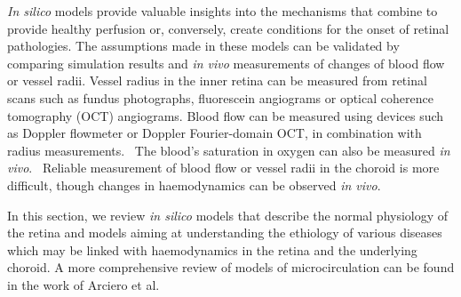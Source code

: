 \documentclass[12pt,a4paper]{journal}
\begin{document}
\textit{In silico} models provide valuable insights into the mechanisms that combine to provide healthy perfusion or, conversely, create conditions for the onset of retinal pathologies.
The assumptions made in these models can be validated by comparing simulation results and \textit{in vivo} measurements of changes of blood flow or vessel radii.
Vessel radius in the inner retina can be measured from retinal scans such as fundus photographs, fluorescein angiograms or optical coherence tomography (OCT) angiograms.
Blood flow can be measured using devices such as Doppler flowmeter or Doppler Fourier-domain OCT, in combination with radius measurements.~\cite{DoblhoffDier_2014,Wang_2009}
The blood's saturation in oxygen can also be measured \textit{in vivo}.~\cite{Geirsdottir_2013}
Reliable measurement of blood flow or vessel radii in the choroid is more difficult, though changes in haemodynamics can be observed \textit{in vivo}.~\cite{Riva_1997,Scherm_2019}

In this section, we review \textit{in silico} models that describe the normal physiology of the retina and models aiming at understanding the ethiology of various diseases which may be linked with haemodynamics in the retina and the underlying choroid.
A more comprehensive review of models of microcirculation can be found in the work of Arciero et al.~\cite{Arciero_2017}
\end{document}
